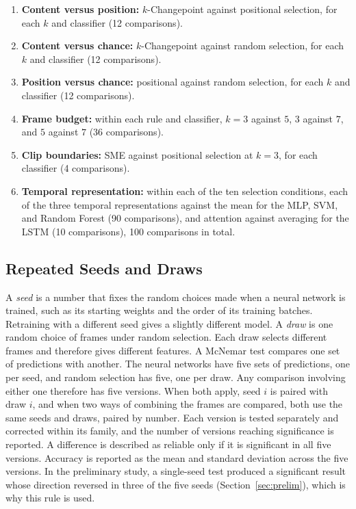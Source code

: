 \begin{enumerate}
   \item \textbf{Content versus position:} $k$-Changepoint against positional selection, for each $k$ and classifier (12 comparisons).
   \item \textbf{Content versus chance:} $k$-Changepoint against random selection, for each $k$ and classifier (12 comparisons).
   \item \textbf{Position versus chance:} positional against random selection, for each $k$ and classifier (12 comparisons).
   \item \textbf{Frame budget:} within each rule and classifier, $k = 3$ against $5$, $3$ against $7$, and $5$ against $7$ (36 comparisons).
   \item \textbf{Clip boundaries:} SME against positional selection at $k = 3$, for each classifier (4 comparisons).
   \item \textbf{Temporal representation:} within each of the ten selection conditions, each of the three temporal representations against the mean for the MLP, SVM, and Random Forest (90 comparisons), and attention against averaging for the LSTM (10 comparisons), 100 comparisons in total.
\end{enumerate}

\subsection{Repeated Seeds and Draws}
\label{sec:seeds}

A \emph{seed} is a number that fixes the random choices made when a neural network is trained, such as its starting weights and the order of its training batches. Retraining with a different seed gives a slightly different model. A \emph{draw} is one random choice of frames under random selection. Each draw selects different frames and therefore gives different features. A McNemar test compares one set of predictions with another. The neural networks have five sets of predictions, one per seed, and random selection has five, one per draw. Any comparison involving either one therefore has five versions. When both apply, seed $i$ is paired with draw $i$, and when two ways of combining the frames are compared, both use the same seeds and draws, paired by number. Each version is tested separately and corrected within its family, and the number of versions reaching significance is reported. A difference is described as reliable only if it is significant in all five versions. Accuracy is reported as the mean and standard deviation across the five versions. In the preliminary study, a single-seed test produced a significant result whose direction reversed in three of the five seeds (Section~\ref{sec:prelim}), which is why this rule is used.

